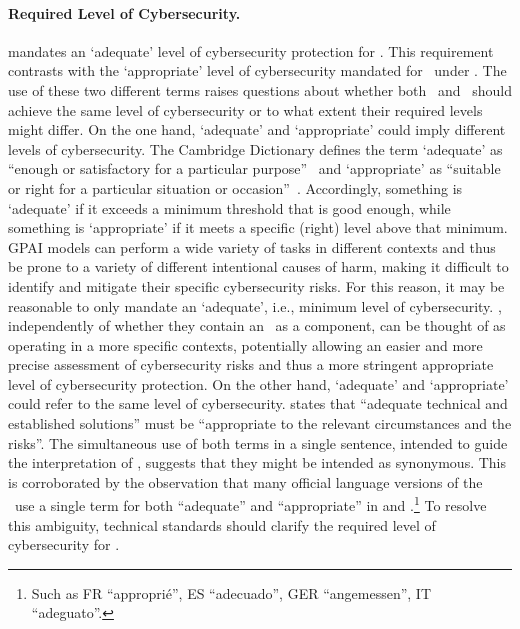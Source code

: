 \paragraph{Required Level of Cybersecurity.}
 mandates an `adequate' level of cybersecurity protection for \GPAIMSSR. This requirement contrasts with the `appropriate' level of cybersecurity mandated for \HRAIS\ under .
%
The use of these two different terms raises questions about whether both \HRAIS\ and \GPAIMS\ should achieve the same level of cybersecurity or to what extent their required levels might differ.
%
On the one hand, `adequate' and `appropriate' could imply different levels of cybersecurity. The Cambridge Dictionary defines the term `adequate' as ``enough or satisfactory for a particular purpose''~\cite{CambridgeAdequate} and `appropriate' as ``suitable or right for a particular situation or occasion''~\cite{CambridgeAppropriate}.
% 
Accordingly, something is `adequate' if it exceeds a minimum threshold that is good enough, while something is `appropriate' if it meets a specific (right) level above that minimum.
%
GPAI models can perform a wide variety of tasks in different contexts and thus be prone to a variety of different intentional causes of harm, making it difficult to identify and mitigate their specific cybersecurity risks.
%
For this reason, it may be reasonable to only mandate an `adequate', i.e., minimum level of cybersecurity.
%
\HRAIS, independently of whether they contain an \GPAIM\ as a component, can be thought of as operating in a more specific contexts, potentially allowing an easier and more precise assessment of cybersecurity risks and thus a more stringent appropriate level of cybersecurity protection.
%
On the other hand, `adequate' and `appropriate' could refer to the same level of cybersecurity.
%
 states that ``adequate technical and established solutions'' must be ``appropriate to the relevant circumstances and the risks''. The simultaneous use of both terms in a single sentence, intended to guide the interpretation of  , suggests that they might be intended as synonymous. This is corroborated by the observation that many official language versions of the \EUAIAct\ use a single term for both ``adequate'' and ``appropriate'' in  and .\footnote{Such as FR ``approprié'', ES ``adecuado'', GER ``angemessen'', IT ``adeguato''.} 
%
To resolve this ambiguity, technical standards should clarify the required level of cybersecurity for \GPAIMSSR.
